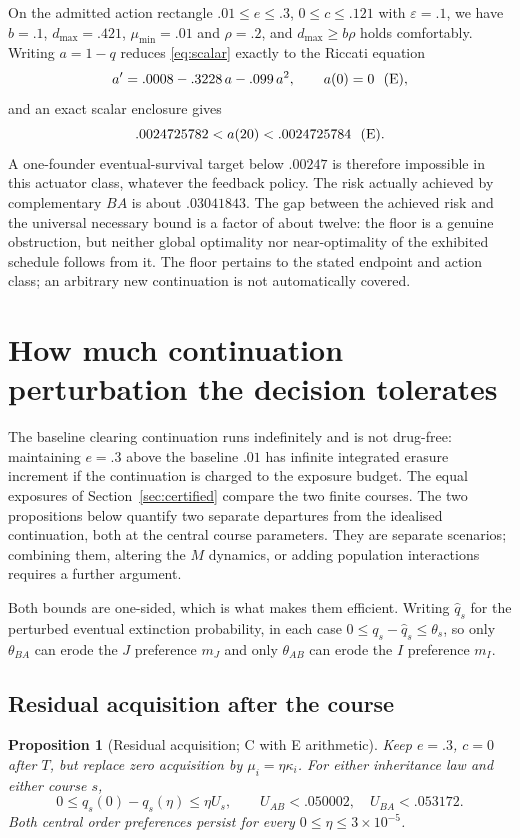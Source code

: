 \documentclass[11pt]{article}
\newtheorem{proposition}[theorem]{Proposition}
\theoremstyle{remark}
\newcommand{\eps}{\varepsilon}
\begin{document}
On the admitted action rectangle $.01\le e\le.3$, $0\le c\le.121$ with $\eps=.1$,
we have $b=.1$, $d_{\max}=.421$, $\mu_{\min}=.01$ and $\rho=.2$, and
$d_{\max}\ge b\rho$ holds comfortably. Writing $a=1-q$ reduces \eqref{eq:scalar}
exactly to the Riccati equation
\begin{equation}
 a'=.0008-.3228\,a-.099\,a^2,\qquad a(0)=0\ \ \text{\textup{(E)}},
 \label{eq:riccati}
\end{equation}
and an exact scalar enclosure gives
\begin{equation}
 .0024725782<a(20)<.0024725784\ \ \text{\textup{(E)}}.\label{eq:concretefloor}
\end{equation}
A one-founder eventual-survival target below $.00247$ is therefore impossible in
this actuator class, whatever the feedback policy. The risk actually achieved by
complementary $BA$ is about $.03041843$. The gap between the achieved risk and
the universal necessary bound is a factor of about twelve: the floor is a genuine
obstruction, but neither global optimality nor near-optimality of the exhibited
schedule follows from it. The floor pertains to the stated endpoint and action
class; an arbitrary new continuation is not automatically covered.

\section{How much continuation perturbation the decision tolerates}
\label{sec:continuation}

The baseline clearing continuation runs indefinitely and is not drug-free:
maintaining $e=.3$ above the baseline $.01$ has infinite integrated erasure
increment if the continuation is charged to the exposure budget. The equal
exposures of Section~\ref{sec:certified} compare the two finite courses. The two
propositions below quantify two separate departures from the idealised
continuation, both at the central course parameters. They are separate
scenarios; combining them, altering the $M$ dynamics, or adding population
interactions requires a further argument.

Both bounds are one-sided, which is what makes them efficient. Writing
$\widehat q_s$ for the perturbed eventual extinction probability, in each case
$0\le q_s-\widehat q_s\le\theta_s$, so only $\theta_{BA}$ can erode the $J$
preference $m_J$ and only $\theta_{AB}$ can erode the $I$ preference $m_I$.

\subsection{Residual acquisition after the course}
\begin{proposition}[Residual acquisition; C with E arithmetic]\label{prop:residual}
Keep $e=.3$, $c=0$ after $T$, but replace zero acquisition by
$\mu_i=\eta\kappa_i$. For either inheritance law and either course $s$,
\[
 0\le q_s(0)-q_s(\eta)\le\eta U_s,\qquad
 U_{AB}<.050002,\quad U_{BA}<.053172.
\]
Both central order preferences persist for every $0\le\eta\le3\times10^{-5}$.
\end{proposition}
\end{document}

